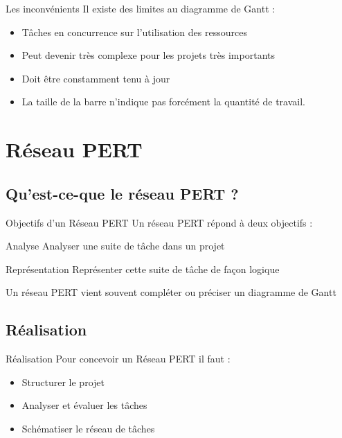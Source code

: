 \documentclass[handout]{beamer}
\begin{document}
\begin{frame}{Les inconvénients}
    Il existe des limites au diagramme de Gantt :
    \vspace{\baselineskip}
    \begin{itemize}
    \item{Tâches en concurrence sur l'utilisation des ressources}
    \item{Peut devenir très complexe pour les projets très importants}
    \item{Doit être constamment tenu à jour}
    \item{La taille de la barre n’indique pas forcément la quantité de travail.}
    \end{itemize}
\end{frame}

\section{Réseau PERT}

\subsection{Qu'est-ce-que le réseau PERT ?}

\begin{frame}{Objectifs d'un Réseau PERT}
    Un réseau PERT répond à deux objectifs :
    \pause
    \begin{block}{Analyse}
        Analyser une suite de tâche dans un projet
    \end{block}
    \pause
    \begin{block}{Représentation}
        Représenter cette suite de tâche de façon logique
    \end{block}
    \vspace{\baselineskip}
    \pause
    Un réseau PERT vient souvent compléter ou préciser un diagramme de Gantt
\end{frame}

\subsection{Réalisation}

\begin{frame}{Réalisation}
    Pour concevoir un Réseau PERT il faut :
    \begin{itemize}
     \item {
    Structurer le projet
    \pause %
  }
  \item {   
    Analyser et évaluer les tâches
    \pause
  }
  \item {   
    Schématiser le réseau de tâches
      }
\end{itemize}
\end{frame}
\end{document}

